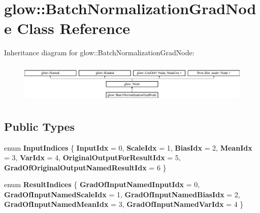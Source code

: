 \hypertarget{classglow_1_1_batch_normalization_grad_node}{}\section{glow\+:\+:Batch\+Normalization\+Grad\+Node Class Reference}
\label{classglow_1_1_batch_normalization_grad_node}
Inheritance diagram for glow\+:\+:Batch\+Normalization\+Grad\+Node\+:\begin{figure}[H]
\begin{center}
\leavevmode
\includegraphics[height=1.926605cm]{classglow_1_1_batch_normalization_grad_node}
\end{center}
\end{figure}
\subsection*{Public Types}
\begin{DoxyCompactItemize}
\item 
\mbox{\label{classglow_1_1_batch_normalization_grad_node_aec2e1c9a901a8f640f7b259f1a984a35}} 
enum {\bfseries Input\+Indices} \{ \newline
{\bfseries Input\+Idx} = 0, 
{\bfseries Scale\+Idx} = 1, 
{\bfseries Bias\+Idx} = 2, 
{\bfseries Mean\+Idx} = 3, 
\newline
{\bfseries Var\+Idx} = 4, 
{\bfseries Original\+Output\+For\+Result\+Idx} = 5, 
{\bfseries Grad\+Of\+Original\+Output\+Named\+Result\+Idx} = 6
 \}
\item 
\mbox{\label{classglow_1_1_batch_normalization_grad_node_a10f6c3bb2e41b59ebd8ac230c923fd86}} 
enum {\bfseries Result\+Indices} \{ \newline
{\bfseries Grad\+Of\+Input\+Named\+Input\+Idx} = 0, 
{\bfseries Grad\+Of\+Input\+Named\+Scale\+Idx} = 1, 
{\bfseries Grad\+Of\+Input\+Named\+Bias\+Idx} = 2, 
{\bfseries Grad\+Of\+Input\+Named\+Mean\+Idx} = 3, 
\newline
{\bfseries Grad\+Of\+Input\+Named\+Var\+Idx} = 4
 \}
\end{DoxyCompactItemize}
